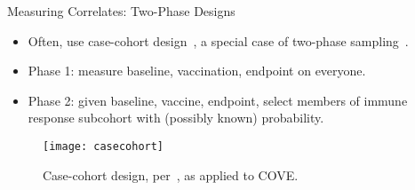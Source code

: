 \documentclass{beamer}
\begin{document}
\begin{frame}[c]{Measuring Correlates: Two-Phase Designs}

\begin{center}
\begin{itemize}
  \itemsep8pt
    \item Often, use case-cohort design~\citep{prentice1986case}, a special
      case of two-phase sampling~\citep{breslow2003large}.
    \item Phase 1: measure baseline, vaccination, endpoint on everyone.
    \item Phase 2: given baseline, vaccine, endpoint, select members of
      immune response subcohort with (possibly known) probability.
\end{itemize}
\begin{figure}[H]
  \centering
  \texttt{[image: casecohort]}
  \captionsetup{labelformat=empty}
  \vspace{-1em}
  \caption{
    \tiny Case-cohort design, per~\citet{prentice1986case}, as applied to COVE.
  }
\end{figure}
\end{center}

\note{
}

\end{frame}



\end{document}
